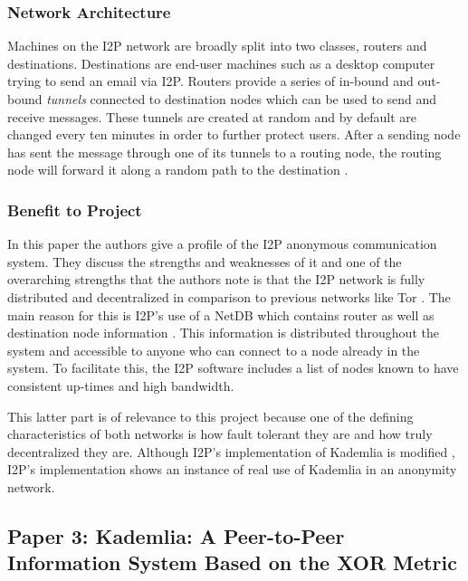 \documentclass[notitlepage,12pt]{article}
\begin{document}
\subsubsection{Network Architecture}
\label{sec:netarch}

Machines on the I2P network are broadly split into two classes, routers and
destinations. Destinations are end-user machines such as a desktop computer
trying to send an email via I2P. Routers provide a series of in-bound and
out-bound \emph{tunnels} connected to destination nodes which can be used to
send and receive messages. These tunnels are created at random and by default
are changed every ten minutes in order to further protect users. After a sending
node has sent the message through one of its tunnels to a routing node, the
routing node will forward it along a random path to the destination
\cite[p. 404]{i2p}. 

\subsubsection{Benefit to Project}
\label{sec:benp2}

In this paper the authors give a profile of the I2P anonymous communication
system. They discuss the strengths and weaknesses of it and one of the
overarching strengths that the authors note is that the I2P network is fully
distributed and decentralized in comparison to previous networks like Tor
\cite[p. 407]{i2p}. The main reason for this is I2P's use of a NetDB which
contains router as well as destination node information \cite[p. 405]{i2p}. This
information is distributed throughout the system and accessible to anyone who
can connect to a node already in the system. To facilitate this, the I2P
software includes a list of nodes known to have consistent up-times and high
bandwidth\cite[p. 405]{i2p}. 

This latter part is of relevance to this project because one of the defining
characteristics of both networks is how fault tolerant they are and how truly
decentralized they are. Although I2P's implementation of Kademlia is modified
\cite[p. 401]{i2p}, I2P's implementation shows an instance of real use of
Kademlia in an anonymity network.

\subsection{Paper 3: Kademlia: A Peer-to-Peer Information System Based on the XOR Metric}
\label{sec:kadp3}
\end{document}
